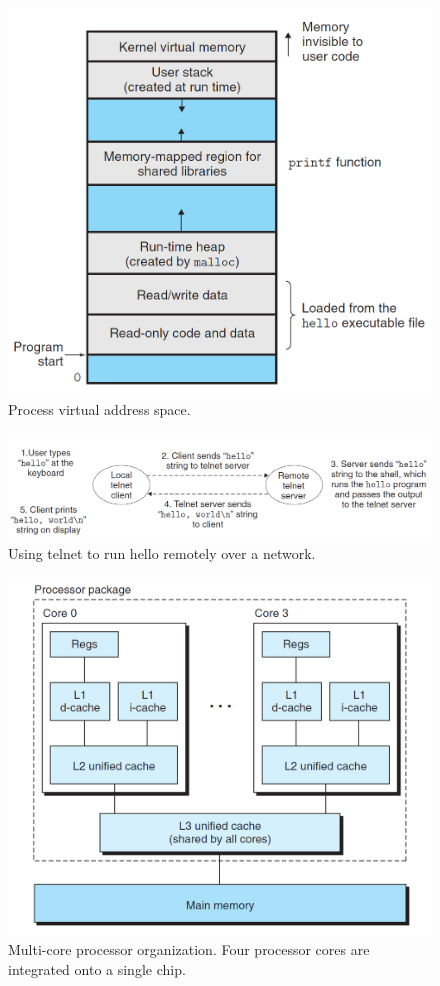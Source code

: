\documentclass[chapter,oneside]{oblivoir}
\begin{document}
\begin{figure}[h!]
    \centering
    \includegraphics[scale=0.5]{pic/pic7.png}
    \caption{Process virtual address space.}
\end{figure}

\begin{figure}[h!]
    \centering
    \includegraphics[scale=0.4]{pic/pic8.png}
    \caption{Using telnet to run hello remotely over a network.}
\end{figure}

\begin{figure}[h!]
    \centering
    \includegraphics[scale=0.5]{pic/pic9.png}
    \caption{Multi-core processor organization. Four processor cores are integrated onto a single chip.}
\end{figure}
\end{document}
